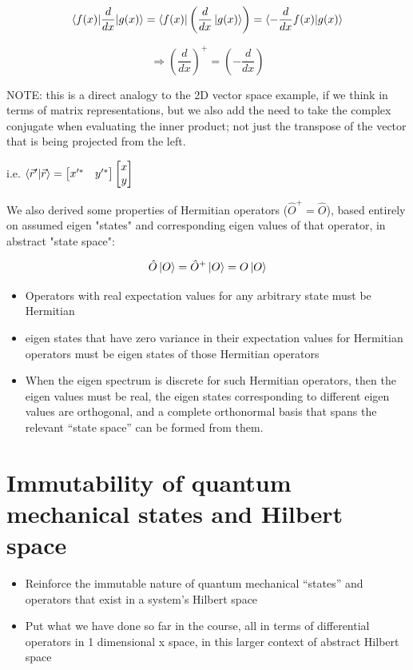 \documentclass{article}
\begin{document}
$$\braket{f(x) | \frac{d}{dx} | g(x)} = \bra{f(x)} \left( \frac{d}{dx} \ket{g(x)} \right) = \braket{- \frac{d}{dx} f(x) | g(x)}$$

$$\Rightarrow \left( \frac{d}{dx} \right)^+ = \left( - \frac{d}{dx} \right)$$

NOTE: this is a direct analogy to the 2D vector space example, if we think in terms of matrix representations, but we also add the need to take the complex conjugate when evaluating the inner product; not just the transpose of the vector that is being projected from the left. 

i.e. $\braket{\vec{r}'|\vec{r}} = \begin{bmatrix} x'^* & y'^* \end{bmatrix} \begin{bmatrix} x\\ y \end{bmatrix}$

We also derived some properties of Hermitian operators ($\hat{O}^+ = \hat{O}$), based entirely on assumed eigen "states" and corresponding eigen values of that operator, in abstract "state space":

$$\hat{O} \ket{O} = \hat{O}^+ \ket{O} = O \ket{O}$$

\begin{itemize}
    \item Operators with real expectation values for any arbitrary state must be Hermitian
    \item eigen states that have zero variance in their expectation values for Hermitian operators must be eigen states of those Hermitian operators
    \item When the eigen spectrum is discrete for such Hermitian operators, then the eigen values must be real, the eigen states corresponding to different eigen values are orthogonal, and a complete orthonormal basis that spans the relevant “state space” can be formed from them.
\end{itemize}

\section{Immutability of quantum mechanical states and Hilbert space}


\begin{itemize}
    \item Reinforce the immutable nature of quantum mechanical “states” and operators that exist in a system’s Hilbert space
    \item Put what we have done so far in the course, all in terms of differential operators in 1 dimensional x space, in this larger context of abstract Hilbert space
\end{itemize}
\end{document}
